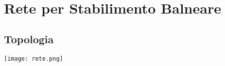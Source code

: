 \section{Rete per Stabilimento Balneare}

\begin{landscape}
    \subsection{Topologia}
    \thispagestyle{empty}
    \texttt{[image: rete.png]}
\end{landscape}